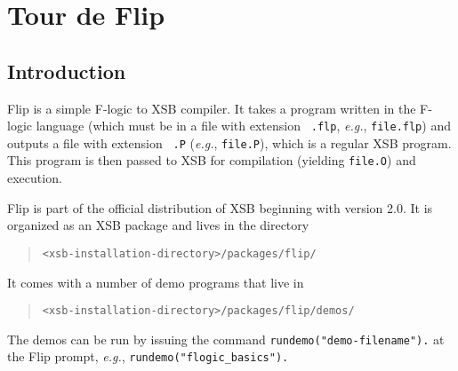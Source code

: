 \newcommand{\FdConstr}{\ensuremath{\stackrel{constr}{\Fd}}}
\newcommand{\MvdConstr}{\ensuremath{\stackrel{constr}{\Mvd}}}

\newlength{\flogicindent}


\newlength{\flength}
\newlength{\counterlength}


\newcommand{\la}{\ensuremath{\,\leftarrow\,}}

\newcommand{\anon}{\_}

\newcommand{\note}[1]{\textit{[[#1]]}}
\newcommand{\nterm}[1]{\ensuremath{\langle}\textit{#1}\ensuremath{\rangle}}


\newcommand{\NI}{\noindent}

\newcommand{\bs}{\ensuremath{\backslash}}
\newcommand{\FLIP}{{\mbox{\sc Flip}}\xspace}
\newcommand{\FLORID}{{\textsc{Florid}}\xspace}
\newcommand{\fl}{{F-logic}\xspace}


\newcommand{\consts}{\ensuremath{\mathcal{C}}}
\newcommand{\funcs}{\ensuremath{\mathcal{F}}}
\newcommand{\preds}{\ensuremath{\mathcal{P}}}
\newcommand{\vars}{\ensuremath{\mathcal{V}}}

\newcommand{\HU}{\ensuremath{U}}
\newcommand{\HB}{\ensuremath{\mathcal{HB}}}
\newcommand{\ext}{\ensuremath{^{\star}}}




\chapter{Tour de \FLIP}

\author{Bertram Lud\"ascher}


\section{Introduction}

\FLIP is a simple F-logic to XSB compiler. It takes a program written in the 
F-logic language \cite{KLW95} (which must be in a file with extension {\tt
  .flp}, {\it e.g.}, {\tt file.flp}) and outputs a file with extension {\tt
  .P} ({\it e.g.}, {\tt file.P}), which is a regular XSB program. This
program is then passed to XSB for compilation (yielding {\tt file.O}) and
execution. 

\FLIP is part of the official distribution of XSB beginning with version
2.0. It is organized as an XSB package and lives in the directory
\begin{quote}
 \verb|<xsb-installation-directory>/packages/flip/|  
\end{quote}
It comes with a number of demo programs that live in
\begin{quote}
 \verb|<xsb-installation-directory>/packages/flip/demos/|  
\end{quote}
The demos can be run by issuing the command
\verb|rundemo("demo-filename").| at the \FLIP prompt, {\it e.g.},
\verb|rundemo("flogic_basics").|

